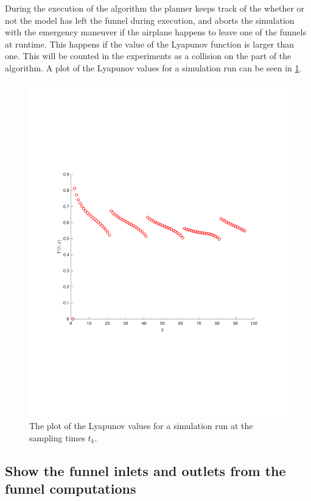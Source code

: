 During the execution of the \rrtfunnel{} algorithm the planner keeps track of
the whether or not the model has left the funnel during execution, and aborts
the simulation with the emergency maneuver if the airplane happens to leave one
of the funnels at runtime. This happens if the value of the Lyapunov function is
larger than one. This will be counted in the experiments as a collision on the
part of the \rrtfunnel{} algorithm. A plot of the Lyapunov values for a
simulation run can be seen in \cref{fig:lyapunov-values}.

\begin{figure}
  \centering
  \includegraphics[scale=.5]{figures/experiments/lyapunov-values-simulation-run}
  \caption{The plot of the Lyapunov values for a simulation run at the sampling
    times \(t_k\).}
  \label{fig:lyapunov-values}
\end{figure}

\subsection{Show the funnel inlets and outlets from the funnel computations}
\label{subsec:funnel-no-composable}

